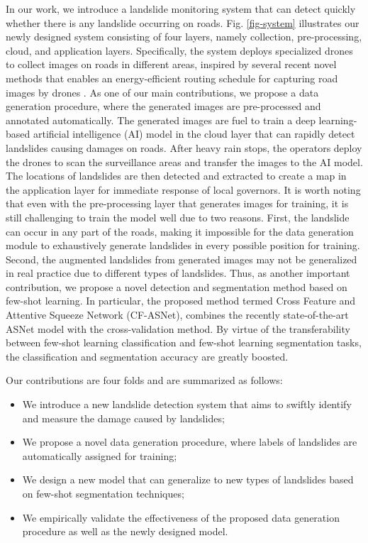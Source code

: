\documentclass{ieeeaccess}
\begin{document}
In our work, we introduce a landslide monitoring system that can detect quickly whether there is any landslide occurring on roads. Fig. \ref{fig-system} illustrates our newly designed system consisting of four layers, namely collection, pre-processing, cloud, and application layers. Specifically, the system deploys specialized drones to collect images on roads in different areas, inspired by several recent novel methods that enables an energy-efficient routing schedule for capturing road images by drones  \cite{lui2022modelling,lui2021modelling}. As one of our main contributions, we propose a data generation procedure, where the generated images are pre-processed and annotated automatically. The generated images are fuel to train a deep learning-based artificial intelligence (AI) model in the cloud layer that can rapidly detect landslides causing damages on roads. After heavy rain stops, the operators deploy the drones to scan the surveillance areas and transfer the images to the AI model. The locations of landslides are then detected and extracted to create a map in the application layer for immediate response of local governors. 
It is worth noting that even with the pre-processing layer that generates images for training, it is still challenging to train the model well due to two reasons. First, the landslide can occur in any part of the roads, making it impossible for the data generation module to exhaustively generate landslides in every possible position for training. Second, the augmented landslides from generated images may not be generalized in real practice due to different types of landslides. Thus, as another important contribution, we propose a novel detection and segmentation method based on few-shot learning. In particular, the 
proposed method termed Cross Feature and Attentive Squeeze Network (CF-ASNet), combines the recently state-of-the-art ASNet model with the cross-validation method. By virtue of the transferability between few-shot learning classification and few-shot learning segmentation tasks, the classification and segmentation accuracy are greatly boosted.

Our contributions are four folds and are summarized as follows:
\begin{itemize}
    \item We introduce a new landslide detection system that aims to swiftly identify and measure the damage caused by landslides;
    \item We propose a novel data generation procedure, where labels of landslides are automatically assigned for training;
    \item We design a new model that can generalize to new types of landslides based on few-shot segmentation techniques;
    \item We empirically validate the effectiveness of the proposed data generation procedure as well as the newly designed model.
\end{itemize}
\end{document}
